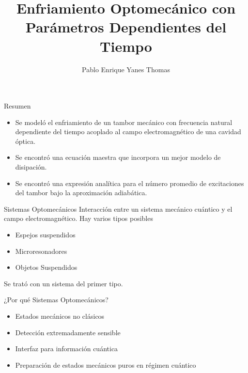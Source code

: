 \documentclass[10pt]{beamer}
\author{Pablo Enrique Yanes Thomas}
\title{Enfriamiento Optomecánico con Parámetros Dependientes del Tiempo}
\institute{IIMAS}
\begin{document}
\begin{frame}
\titlepage
\end{frame}


\begin{frame}{Resumen}

\begin{itemize}
\item Se modeló el enfriamiento de un tambor mecánico con frecuencia natural dependiente del tiempo acoplado al campo electromagnético de una cavidad óptica.

\item Se encontró una  ecuación maestra que incorpora un mejor modelo de disipación.

\item Se encontró una expresión analítica para el número promedio de excitaciones del tambor bajo la aproximación adiabática.
\end{itemize}

\end{frame}

\begin{frame}{Sistemas Optomecánicos}
Interacción entre un sistema mecánico cuántico y el campo electromagnético. Hay varios tipos posibles

\begin{itemize}
\item Espejos suspendidos
\item Microresonadores
\item Objetos Suspendidos
\end{itemize}

Se trató con un sistema del primer tipo.

\end{frame}

\begin{frame}{¿Por qué Sistemas Optomecánicos?}

\begin{itemize}
\item Estados mecánicos no clásicos
\item Detección extremadamente sensible
\item Interfaz para información cuántica
\item Preparación de estados mecánicos puros en régimen cuántico 
\end{itemize}


\end{frame}
\end{document}
